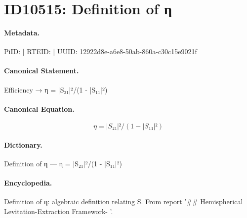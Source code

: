 \section*{ID10515: Definition of η}
\paragraph{Metadata.}
PiID:  | RTEID:  | UUID: 12922d8e-a6e8-50ab-860a-c30c15e9021f

\paragraph{Canonical Statement.}
Efficiency → η = |S₂₁|²/(1 - |S₁₁|²)

\paragraph{Canonical Equation.}
\[
η = |S₂₁|²/(1 - |S₁₁|²)
\]

\paragraph{Dictionary.}
Definition of η — η = |S₂₁|²/(1 - |S₁₁|²)

\paragraph{Encyclopedia.}
Definition of η: algebraic definition relating S. From report '\#\# Hemispherical Levitation-Extraction Framework- '.

